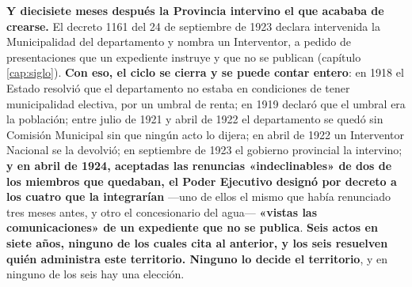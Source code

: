 \textbf{Y diecisiete meses después la Provincia intervino el que acababa de crearse.} El decreto
1161 del 24 de septiembre de 1923 declara intervenida la Municipalidad del departamento y nombra
un Interventor, a pedido de presentaciones que un expediente instruye y que no se publican
(capítulo \ref{cap:siglo}). \textbf{Con eso, el ciclo se cierra y se puede contar entero}: en
1918 el Estado resolvió que el departamento no estaba en condiciones de tener municipalidad
electiva, por un umbral de renta; en 1919 declaró que el umbral era la población; entre julio de
1921 y abril de 1922 el departamento se quedó sin Comisión Municipal sin que ningún acto lo
dijera; en abril de 1922 un Interventor Nacional se la devolvió; en septiembre de 1923 el
gobierno provincial la intervino; \textbf{y en abril de 1924, aceptadas las renuncias
«indeclinables» de dos de los miembros que quedaban, el Poder Ejecutivo designó por decreto a los
cuatro que la integrarían} ---uno de ellos el mismo que había renunciado tres meses antes, y otro
el concesionario del agua--- \textbf{«vistas las comunicaciones» de un expediente que no se
publica}. \textbf{Seis actos en siete años, ninguno de los cuales cita al
anterior, y los seis resuelven quién administra este territorio. Ninguno lo decide el
territorio}, y en ninguno de los seis hay una elección.

